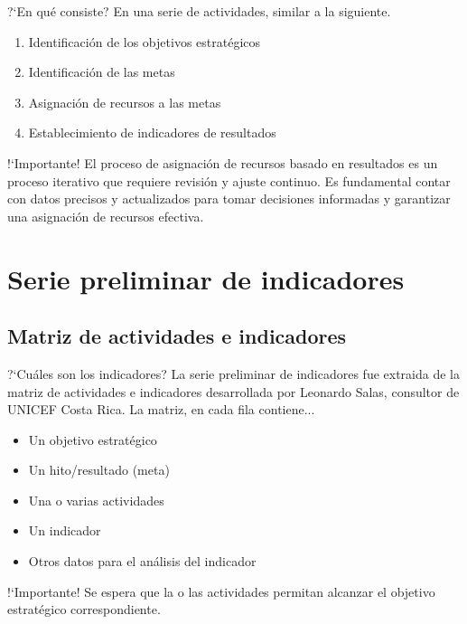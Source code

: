 \documentclass[xcolor=table, aspectratio=169]{beamer}
\begin{document}
\begin{frame}[t]{?`En qu\'e consiste?}
    En una serie de actividades, similar a la siguiente.
    
	\begin{enumerate}
		\item Identificaci\'on de los objetivos estrat\'egicos
		\item Identificaci\'on de las metas
		\item Asignaci\'on de recursos a las metas
		\item Establecimiento de indicadores de resultados
	\end{enumerate}
		
	\begin{block}{!`Importante!}
		El proceso de asignaci\'on de recursos basado en resultados es un proceso iterativo que requiere revisi\'on y ajuste continuo. Es fundamental contar con datos precisos y actualizados para tomar decisiones informadas y garantizar una asignaci\'on de recursos efectiva.
	\end{block}
\end{frame}

\section{Serie preliminar de indicadores}

\subsection{Matriz de actividades e indicadores}

\begin{frame}[t]{?`Cu\'ales son los indicadores?}
    La serie preliminar de indicadores fue extraida de la matriz de actividades e indicadores desarrollada por Leonardo Salas, consultor de UNICEF Costa Rica. La matriz, en cada fila contiene...
    
	\begin{itemize}
		\item Un objetivo estrat\'egico
		\item Un hito/resultado (meta)
		\item Una o varias actividades
		\item Un indicador
		\item Otros datos para el an\'alisis del indicador
	\end{itemize}
		
	\begin{block}{!`Importante!}
		Se espera que la o las actividades permitan alcanzar el objetivo estrat\'egico correspondiente.
	\end{block}
\end{frame}
\end{document}

